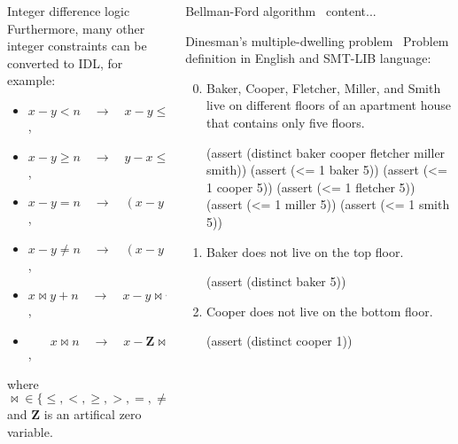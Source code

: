 \documentclass{beamer}
\begin{document}
\begin{frame}[fragile,t]
\begin{columns}[t,onlytextwidth]
\begin{column}{0.485\textwidth}
\begin{block}{Integer difference logic~\cite{slides}}
			Furthermore, many other integer constraints can be converted to IDL, for example:
			\begin{itemize}
				\item $x - y < n \quad\to\quad x - y \leq n - 1$,
				\item $x - y \geq n \quad\to\quad y - x \leq -n$,
				\item $x - y = n \quad\to\quad (x - y \leq n) \land (x - y \geq n)$,
				\item $x - y \neq n \quad\to\quad (x - y < n) \lor (x - y > n)$,
				\item $x \bowtie y + n \quad\to\quad x - y \bowtie n$,
				\item $\quad\;\;\: x \bowtie n \quad\to\quad x - \mathbf{Z} \bowtie n$,
			\end{itemize}
			where ${\bowtie} \in \{\leq, <, \geq, >, =, \neq\}$ and $\mathbf{Z}$ is an artifical zero variable.
		\end{block}
	\end{column}

	\begin{column}{0.485\textwidth}
		\begin{block}{Bellman-Ford algorithm~\cite{CLRS}}
			content...
		\end{block}
	
		\begin{block}{Dinesman's multiple-dwelling problem~\cite{SICP}}
			Problem definition in English and SMT-LIB language:
			\begin{enumerate}
				\setcounter{enumi}{-1} %
				
				\item Baker, Cooper, Fletcher, Miller, and Smith live on different floors of an apartment house that contains only five floors.
				\begin{smtlib}
					(assert (distinct baker cooper fletcher miller smith))
					(assert (<= 1 baker 5))
					(assert (<= 1 cooper 5))
					(assert (<= 1 fletcher 5))
					(assert (<= 1 miller 5))
					(assert (<= 1 smith 5))
				\end{smtlib}
				
				\item Baker does not live on the top floor.
				\begin{smtlib}
					(assert (distinct baker 5))
				\end{smtlib}
			
				\item Cooper does not live on the bottom floor.
				\begin{smtlib}
					(assert (distinct cooper 1))
				\end{smtlib}
				

\end{enumerate}
\end{block}
\end{column}
\end{columns}
\end{frame}
\end{document}
